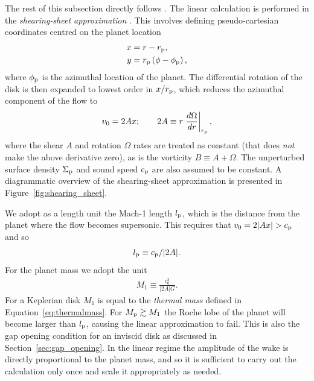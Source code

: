 The rest of this subsection directly follows \citet{goodman2001}. 
The linear calculation is performed in the \textit{shearing-sheet approximation} \citep{hill1878,goldreich1965}.
This involves defining pseudo-cartesian coordinates centred on the planet location
\begin{align}
    x &= r - r_{\rm p}, \label{eq:local_x} \\
    y &= r_{\rm p} \left( \phi - \phi_{\rm p} \right), \label{eq:local_y}
\end{align}
where $\phi_{\rm p}$ is the azimuthal location of the planet.
The differential rotation of the disk is then expanded to lowest order in $x/r_{\rm p}$, which reduces the azimuthal component of the flow to
\begin{align}
    v_0 = 2 A x; \qquad 2A \equiv r \left. \frac{d \Omega}{dr} \right|_{r_{\rm p}},
\end{align}
where the shear $A$ and rotation $\Omega$ rates are treated as constant (that does \textit{not} make the above derivative zero), as is the vorticity $B \equiv A+\Omega$.
The unperturbed surface density $\Sigma_{\rm p}$ and sound speed $c_{\rm p}$ are also assumed to be constant.
A diagrammatic overview of the shearing-sheet approximation is presented in Figure~\ref{fig:shearing_sheet}.

We adopt as a length unit the Mach-1 length $l_{\rm p}$, which is the distance from the planet where the flow becomes supersonic.
This requires that $v_0 = 2|Ax| > c_{\rm p}$ and so 
\begin{align}
    l_{\rm p} \equiv c_{\rm p} / |2A|. \label{eq:mach1_len}
\end{align}
For the planet mass we adopt the unit
\begin{align}
    M_1 \equiv \frac{c_0^3}{|2A|G}. \label{eq:char_mass}
\end{align}
For a Keplerian disk $M_1$ is equal to the \textit{thermal mass} defined in Equation~\eqref{eq:thermalmass}.
For $M_{\rm p} \gtrsim M_1$ the Roche lobe of the planet will become larger than $l_{\rm p}$, causing the linear approximation to fail.
This is also the gap opening condition for an inviscid disk as discussed in Section~\ref{sec:gap_opening}.
In the linear regime the amplitude of the wake is directly proportional to the planet mass, and so it is sufficient to carry out the calculation only once and scale it appropriately as needed.

